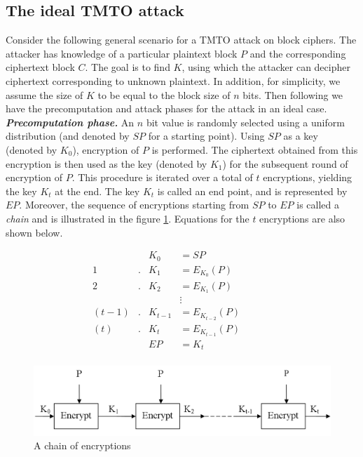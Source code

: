 \subsection{The ideal TMTO attack}
Consider the following general scenario for a TMTO attack on block ciphers. The attacker has knowledge of a particular plaintext block $P$ and the corresponding ciphertext block $C$. The goal is to find $K$, using which the attacker can decipher ciphertext corresponding to unknown plaintext. In addition, for simplicity, we assume the size of $K$ to be equal to the block size of $n$ bits. Then following we have the precomputation and attack phases for the attack in an ideal case.\\

\noindent \textit{\textbf{Precomputation phase.}} An $n$ bit value is randomly selected using a uniform distribution (and denoted by $SP$ for a starting point). Using $SP$ as a key (denoted by $K_0$), encryption of $P$ is performed. The ciphertext obtained from this encryption is then used as the key (denoted by $K_1$) for the subsequent round of encryption of $P$. This procedure is iterated over a total of $t$ encryptions, yielding the key $K_t$ at the end. The key $K_t$ is called an end point, and is represented by $EP$. Moreover, the sequence of encryptions starting from $SP$ to $EP$ is called a \emph{chain} and is illustrated in the figure \ref{fig:block-cipher-single-chain}. Equations for the $t$ encryptions are also shown below. 

\begin{align*}
& & K_0 &= SP & & & &\\
1&. & K_1 &= E_{K_0}(P) & & & &\\
2&. & K_2 &= E_{K_1}(P) & & & &\\
& & &\vdots & & & &\\
(t-1)&. &K_{t-1} &= E_{K_{t-2}}(P) & & & &\\
(t)&. &K_{t} &= E_{K_{t-1}}(P) & & & &\\
& & EP &= K_{t} & & & &\\
\end{align*}

\begin{figure}[ht!]
	\centering
		\includegraphics[width=5.5in]{./figures/block-cipher-single-chain.PNG}
	\caption{A chain of encryptions}	
	\label{fig:block-cipher-single-chain}
\end{figure}

